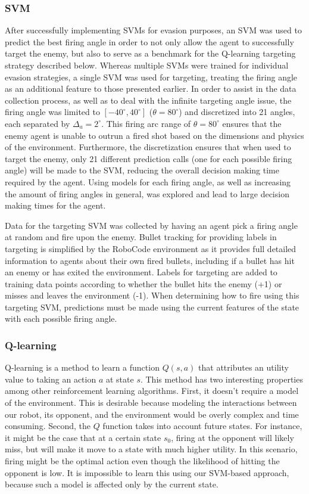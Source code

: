 \documentclass{article}
\theoremstyle{plain}
\theoremstyle{definition}
\theoremstyle{remark}
\begin{document}
\subsubsection*{SVM}
After successfully implementing SVMs for evasion purposes, an SVM was used to predict the best firing angle in order to not only allow the agent to successfully target the enemy, but also to serve as a benchmark for the Q-learning targeting strategy described below. Whereas multiple SVMs were trained for individual evasion strategies, a single SVM was used for targeting, treating the firing angle as an additional feature to those presented earlier. In order to assist in the data collection process, as well as to deal with the infinite targeting angle issue, the firing angle was limited to $[-40^{\circ}, 40^{\circ}]$ ($\theta = 80^{\circ}$) and discretized into 21 angles, each separated by $\Delta_a = 2^{\circ}$. This firing arc range of $\theta = 80^{\circ}$ ensures that the enemy agent is unable to outrun a fired shot based on the dimensions and physics of the environment. Furthermore, the discretization ensures that when used to target the enemy, only 21 different prediction calls (one for each possible firing angle) will be made to the SVM, reducing the overall decision making time required by the agent. Using models for each firing angle, as well as increasing the amount of firing angles in general, was explored and lead to large decision making times for the agent. 

Data for the targeting SVM was collected by having an agent pick a firing angle at random and fire upon the enemy. Bullet tracking for providing labels in targeting is simplified by the RoboCode environment as it provides full detailed information to agents about their own fired bullets, including if a bullet has hit an enemy or has exited the environment. Labels for targeting are added to training data points according to whether the bullet hits the enemy (+1) or misses and leaves the environment (-1). When determining how to fire using this targeting SVM, predictions must be made using the current features of the state with each possible firing angle. 

\subsubsection*{Q-learning}
Q-learning \cite{watkins92a} is a method to learn a function $Q(s, a)$ that attributes an utility value to taking an action $a$ at state $s$. This method has two interesting properties among other reinforcement learning algorithms. First, it doesn't require a model of the environment. This is desirable because modeling the interactions between our robot, its opponent, and the environment would be overly complex and time consuming. Second, the $Q$ function takes into account future states. For instance, it might be the case that at a certain state $s_0$, firing at the opponent will likely miss, but will make it move to a state with much higher utility. In this scenario, firing might be the optimal action even though the likelihood of hitting the opponent is low. It is impossible to learn this using our SVM-based approach, because such a model is affected only by the current state.
\end{document}
